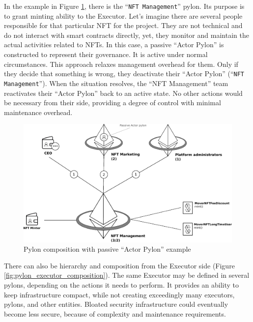 \documentclass[12pt]{article}
\begin{document}
\smallskip

In the example in Figure \ref{fig:pylon_example_composition}, there is the ``\texttt{NFT Management}'' pylon. Its purpose is to grant minting ability to the Executor. Let’s imagine there are several people responsible for that particular NFT for the project. They are not technical and do not interact with smart contracts directly, yet, they monitor and maintain the actual activities related to NFTs. In this case, a passive ``Actor Pylon'' is constructed to represent their governance. It is active under normal circumstances. This approach relaxes management overhead for them. Only if they decide that something is wrong, they deactivate their ``Actor Pylon'' (``\texttt{NFT Management}''). When the situation resolves, the ``NFT Management'' team reactivates their ``Actor Pylon'' back to an active state. No other actions would be necessary from their side, providing a degree of control with minimal maintenance overhead.

\begin{figure}[h!]
  \begin{center}
    \includegraphics[width=1.00\textwidth]{pylon_example_composition.pdf}
    \caption[Figure 1]{Pylon composition with passive ``Actor Pylon'' example
    \label{fig:pylon_example_composition}}
  \end{center}
\end{figure}

There can also be hierarchy and composition from the Executor side (Figure \ref{fig:pylon_executor_composition}). The same Executor may be defined in several pylons, depending on the actions it needs to perform. It provides an ability to keep infrastructure compact, while not creating exceedingly many executors, pylons, and other entities. Bloated security infrastructure could eventually become less secure, because of complexity and maintenance requirements.
\end{document}

